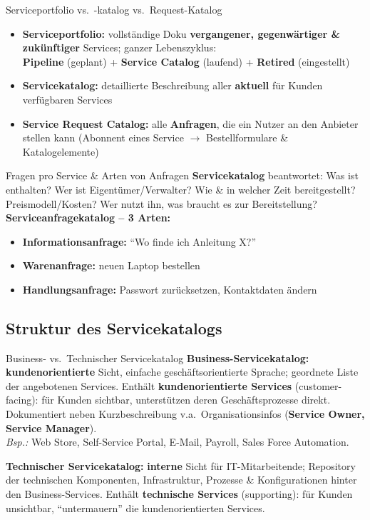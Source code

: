 \documentclass[a4paper, fontsize=7pt]{scrartcl}
\begin{document}
\begin{mainbox}{Serviceportfolio vs.\ -katalog vs.\ Request-Katalog}
\begin{itemize}
    \item \textbf{Serviceportfolio:} vollständige Doku
          \textbf{vergangener, gegenwärtiger \& zukünftiger} Services;
          ganzer Lebenszyklus:\\
          \textbf{Pipeline} (geplant) + \textbf{Service Catalog} (laufend)
          + \textbf{Retired} (eingestellt)
    \item \textbf{Servicekatalog:} detaillierte Beschreibung aller
          \textbf{aktuell} für Kunden verfügbaren Services
    \item \textbf{Service Request Catalog:} alle \textbf{Anfragen}, die
          ein Nutzer an den Anbieter stellen kann (Abonnent eines Service
          $\to$ Bestellformulare \& Katalogelemente)
\end{itemize}
\end{mainbox}

\begin{mainbox}{Fragen pro Service \& Arten von Anfragen}
\textbf{Servicekatalog} beantwortet: Was ist enthalten? Wer ist
Eigentümer/Verwalter? Wie \& in welcher Zeit bereitgestellt?
Preismodell/Kosten? Wer nutzt ihn, was braucht es zur Bereitstellung?\\
\textbf{Serviceanfragekatalog -- 3 Arten:}
\begin{itemize}
    \item \textbf{Informationsanfrage:} ``Wo finde ich Anleitung X?''
    \item \textbf{Warenanfrage:} neuen Laptop bestellen
    \item \textbf{Handlungsanfrage:} Passwort zurücksetzen,
          Kontaktdaten ändern
\end{itemize}
\end{mainbox}

\subsection{Struktur des Servicekatalogs}

\begin{mainbox}{Business- vs.\ Technischer Servicekatalog}
\textbf{Business-Servicekatalog:} \textbf{kundenorientierte} Sicht, einfache
geschäftsorientierte Sprache; geordnete Liste der angebotenen Services.
Enthält \textbf{kundenorientierte Services} (customer-facing): für Kunden
sichtbar, unterstützen deren Geschäftsprozesse direkt. Dokumentiert neben
Kurzbeschreibung v.a.\ Organisationsinfos (\textbf{Service Owner, Service
Manager}).\\
\emph{Bsp.:} Web Store, Self-Service Portal, E-Mail, Payroll, Sales Force
Automation.

\textbf{Technischer Servicekatalog:} \textbf{interne} Sicht für
IT-Mitarbeitende; Repository der technischen Komponenten, Infrastruktur,
Prozesse \& Konfigurationen hinter den Business-Services. Enthält
\textbf{technische Services} (supporting): für Kunden unsichtbar,
``untermauern'' die kundenorientierten Services.
\end{mainbox}
\end{document}
